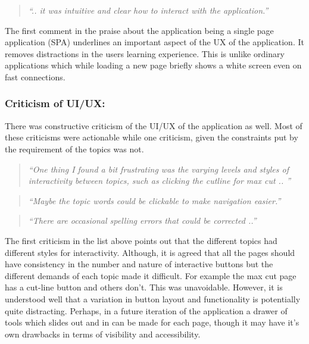 \vspace{0.06 in}
\begin{quote}
\emph{``.. it was intuitive and clear how to
interact with the application.''}
\end{quote}


The first comment in the praise about the application being a single page
application (SPA) underlines an important aspect of the UX of the application.
It removes distractions in the users learning experience. This is unlike
ordinary applications which while loading a new page briefly shows a white
screen even on fast connections.


\subsubsection{Criticism of UI/UX:}
There was constructive criticism of the UI/UX of the application as well.
Most of these criticisms were actionable while one criticism, given the
constraints put by the requirement of the topics was not.

\begin{quote}
\emph{``One thing I found a bit frustrating was the varying levels and styles of
interactivity between topics, such as clicking the cutline for max cut .. ''}
\end{quote}

\vspace{0.06 in}

\begin{quote}
\emph{``Maybe the topic words could be clickable to make navigation easier.''}
\end{quote}

\vspace{0.06 in}
\begin{quote}
\emph{``There are occasional spelling errors that
   could be corrected ..'' }
\end{quote}

The first criticism in the list above points out that the different topics had
different styles for interactivity.  Although, it is agreed that all the pages
should have consistency in the number and nature of interactive buttons
but the different demands of each topic made it difficult. For example the max
cut page has a cut-line button and others don't. This was unavoidable.
However, it is understood well that a variation in button layout and
functionality is potentially quite distracting. Perhaps, in a future iteration
of the application a drawer of tools which slides out and in can be made for
each page, though it may have it's own drawbacks in terms of visibility and
accessibility.

